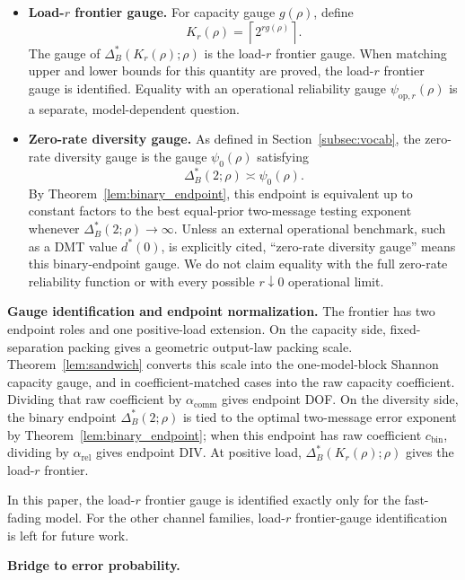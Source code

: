 \documentclass[lettersize,onecolumn]{IEEEtran}
\newcommand{\snr}{\rho}
\begin{document}
\begin{itemize}
\item \textbf{Load-$r$ frontier gauge.} For capacity gauge $g(\snr)$,
define
\[
    K_r(\snr)=\left\lceil 2^{r g(\snr)}\right\rceil.
\]
The gauge of $\Delta_B^*(K_r(\snr);\snr)$ is the load-$r$ frontier
gauge. When matching upper and lower bounds for this quantity are
proved, the load-$r$ frontier gauge is identified. Equality with an
operational reliability gauge $\psi_{\mathrm{op},r}(\snr)$ is a
separate, model-dependent question.

\item \textbf{Zero-rate diversity gauge.} As defined in
Section~\ref{subsec:vocab}, the zero-rate diversity gauge is the gauge
$\psi_0(\snr)$ satisfying
\[
  \Delta_B^*(2;\snr) \asymp \psi_0(\snr).
\]
By Theorem~\ref{lem:binary_endpoint}, this endpoint is equivalent up to
constant factors to the best equal-prior two-message testing exponent
whenever $\Delta_B^*(2;\snr) \to \infty$. Unless an external
operational benchmark, such as a DMT value $d^*(0)$, is explicitly
cited, ``zero-rate diversity gauge'' means this binary-endpoint gauge.
We do not claim equality with the full zero-rate reliability function
or with every possible $r \downarrow 0$ operational limit.

\end{itemize}

\textbf{Gauge identification and endpoint normalization.}
The frontier has two endpoint roles and one
positive-load extension. On the capacity side, fixed-separation
packing gives a geometric output-law packing scale.
Theorem~\ref{lem:sandwich} converts this scale into the one-model-block
Shannon capacity gauge, and in coefficient-matched cases into the raw
capacity coefficient. Dividing that raw coefficient by
$\alpha_{\mathrm{comm}}$ gives endpoint DOF. On the diversity side,
the binary endpoint $\Delta_B^*(2;\snr)$ is tied to the optimal
two-message error exponent by Theorem~\ref{lem:binary_endpoint}; when
this endpoint has raw coefficient $c_{\mathrm{bin}}$, dividing by
$\alpha_{\mathrm{rel}}$ gives endpoint DIV. At positive load,
$\Delta_B^*(K_r(\snr);\snr)$ gives the load-$r$ frontier.

In this paper, the load-$r$ frontier gauge is identified exactly
only for the fast-fading model. For the other channel families,
load-$r$ frontier-gauge identification is left for future work.

\textbf{Bridge to error probability.}
\end{document}
